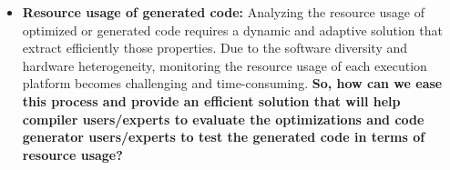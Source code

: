 \begin{itemize}
	\item \textbf{Resource usage of generated code:} 
	Analyzing the resource usage of optimized or generated code requires a dynamic and adaptive solution that extract efficiently those properties. Due to the software diversity and hardware heterogeneity, monitoring the resource usage of each execution platform becomes challenging and time-consuming. 	
	\textbf{So, how can we ease this process and provide an efficient solution that will help compiler users/experts to evaluate the optimizations and code generator users/experts to test the generated code in terms of resource usage?}
	

	

\end{itemize}


%

